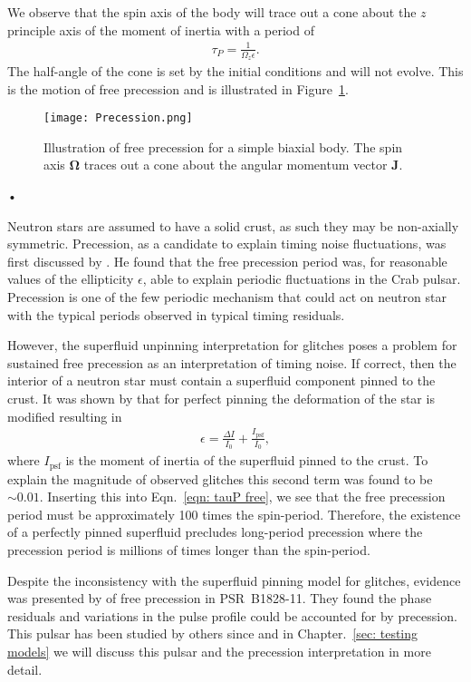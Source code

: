 We observe that the spin axis of the body will trace out a cone about the $z$
principle axis of the moment of inertia with a period of
\begin{align}
\tau_P = \frac{1}{\Omega_{z}\epsilon}.
\label{eqn: tauP free}
\end{align}
The half-angle of the cone is set by the
initial conditions and will not evolve. This is the motion of free precession
and is illustrated in Figure~\ref{fig: precession}.
\begin{figure}[htb]
\centering
\texttt{[image: Precession.png]}
\caption{Illustration of free precession for a simple biaxial body. The spin
    axis $\mathbf{\Omega}$ traces out a cone about the angular momentum vector $\mathbf{J}$.}
\label{fig: precession}
\end{figure}•

Neutron stars are assumed to have a solid crust, as such they may be
non-axially symmetric. Precession, as a candidate to explain timing noise
fluctuations, was first discussed by \citet{Ruderman1970}. He found that the
free precession period was, for reasonable values of the  ellipticity
$\epsilon$, able to explain periodic fluctuations in the Crab pulsar.
Precession is one of the few periodic mechanism that could act on neutron star
with the typical periods observed in typical timing residuals.

However, the superfluid unpinning interpretation for glitches poses a problem for
sustained free precession as an interpretation of timing noise. If correct,
then the interior of a neutron star must contain a superfluid component pinned
to the crust. It was shown by \citet{Shaham1977} that for perfect pinning the
deformation of the star is modified resulting in
\begin{align}
\epsilon = \frac{\Delta I}{I_0} + \frac{I_{\textrm{psf}}}{I_0},
\end{align}
where $I_\textrm{psf}$ is the moment of inertia of the superfluid pinned to the
crust. To explain the magnitude of observed glitches this second term was found
to be $\sim 0.01$. Inserting this into Eqn.~\eqref{eqn: tauP free}, we see that
the free precession period must be approximately 100 times the spin-period. Therefore,
the existence of a perfectly pinned superfluid precludes long-period precession
where the precession period is millions of times longer than the spin-period.

Despite the inconsistency with the superfluid pinning model for glitches,
evidence was presented by \citet{Stairs2000} of free precession in
PSR~B1828-11. They found the phase residuals and variations in the pulse profile
could be accounted for by precession. This pulsar has been studied by others
since and in Chapter.~\ref{sec: testing models} we will discuss this pulsar and
the precession interpretation in more detail.

